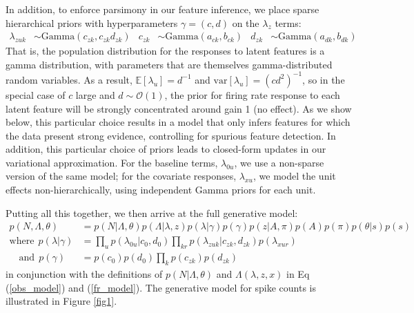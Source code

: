 \documentclass[12pt,a4paper]{article}
\begin{document}
In addition, to enforce parsimony in our feature inference, we place sparse hierarchical priors with hyperparameters $\gamma = (c, d)$ on the $\lambda_z$ terms:
\begin{align}
    \label{hierarchy}
    \lambda_{zuk} &\sim \text{Gamma}(c_{zk}, c_{zk} d_{zk}) & c_{zk} &\sim \text{Gamma}(a_{ck}, b_{ck})
    & d_{zk} &\sim \text{Gamma}(a_{dk}, b_{dk})
\end{align}
That is, the population distribution for the responses to latent features is a gamma distribution, with parameters that are themselves gamma-distributed random variables. As a result, $\mathbb{E}[\lambda_u] = d^{-1}$ and $\text{var}[\lambda_u] = (cd^2)^{-1}$, so in the special case of $c$ large and $d\sim \mathcal{O}(1)$, the prior for firing rate response to each latent feature will be strongly concentrated around gain 1 (no effect). As we show below, this particular choice results in a model that only infers features for which the data present strong evidence, controlling for spurious feature detection. In addition, this particular choice of priors leads to closed-form updates in our variational approximation. For the baseline terms, $\lambda_{0u}$, we use a non-sparse version of the same model; for the covariate responses, $\lambda_{xu}$, we model the unit effects non-hierarchically, using independent Gamma priors for each unit.

Putting all this together, we then arrive at the full generative model:
\begin{align}
    p(N, \Lambda, \theta) &= p(N| \Lambda, \theta)p(\Lambda|\lambda, z)
    p(\lambda|\gamma) p(\gamma)
    p(z|A, \pi)
    p(A)p(\pi)p(\theta|s)p(s) \\
    \text{where} ~~ p(\lambda|\gamma) &= \prod_u p(\lambda_{0u}|c_0, d_0)\prod_{kr} p(\lambda_{zuk}|c_{zk}, d_{zk}) p(\lambda_{xur}) \\
    \text{~~ and} ~~ p(\gamma) &= p(c_0)p(d_0)\prod_k p(c_{zk}) p(d_{zk})
\end{align}
in conjunction with the definitions of $p(N|\Lambda, \theta)$ and $\Lambda(\lambda, z, x)$ in Eq (\ref{obs_model}) and (\ref{fr_model}). The generative model for spike counts is illustrated in Figure \ref{fig1}.
\end{document}
